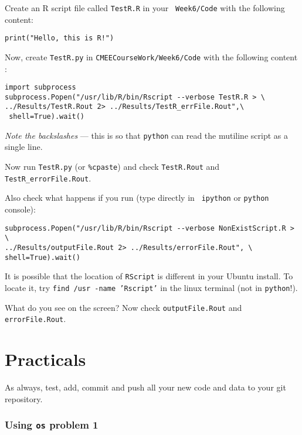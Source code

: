 \begin{compactitem}[$\quad\star$]

\item Create an R script file called {\tt TestR.R} in your {\tt 
Week6/Code} with the following content:
\begin{lstlisting}
print("Hello, this is R!")
\end{lstlisting}

\item Now, create {\tt TestR.py} in {\tt CMEECourseWork/Week6/Code} with the 
following content :
\begin{lstlisting}
import subprocess
subprocess.Popen("/usr/lib/R/bin/Rscript --verbose TestR.R > \
../Results/TestR.Rout 2> ../Results/TestR_errFile.Rout",\
 shell=True).wait()
\end{lstlisting}

{\it Note the backslashes} --- this is so that {\tt python} can read 
the mutiline script as a single line.

\item Now run {\tt TestR.py} (or {\tt \%cpaste}) and check {\tt TestR.Rout} 
and {\tt TestR\_errorFile.Rout}. 

\item Also check what happens if you run (type directly in {\tt 
ipython} or {\tt python} console):
\begin{lstlisting}
subprocess.Popen("/usr/lib/R/bin/Rscript --verbose NonExistScript.R > \
../Results/outputFile.Rout 2> ../Results/errorFile.Rout", \
shell=True).wait()
\end{lstlisting}

\end{compactitem}

\begin{tipbox}
It is possible that the location of {\tt RScript} is different in your 
Ubuntu install. To locate it, try {\tt find /usr -name 'Rscript'} in the linux
terminal (not in {\tt python}!).
\end{tipbox}

What do you see on the screen? Now check {\tt outputFile.Rout} and 
{\tt errorFile.Rout}.

\section{Practicals}
As always, test, add, commit and push all your new code and data to 
your git repository. 
	
\subsubsection{Using {\tt os} problem 1} 
	
